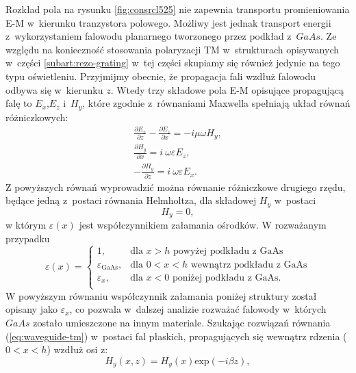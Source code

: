 Rozkład pola na rysunku \ref{fig:consrcl525} nie zapewnia transportu promieniowania E-M w~kierunku tranzystora polowego. Możliwy jest jednak transport energii z~wykorzystaniem falowodu planarnego tworzonego przez podkład z~$GaAs$. Ze względu na konieczność stosowania polaryzacji TM w~strukturach opisywanych w~części \ref{subart:rezo-grating} w~tej części skupiamy się również jedynie na tego typu oświetleniu. Przyjmijmy obecnie, że propagacja fali wzdłuż falowodu odbywa się w~kierunku $z$. Wtedy trzy składowe pola E-M opisujące propagującą falę to $E_x$,$E_z$ i~$H_y$, które zgodnie z~równaniami Maxwella spełniają układ równań różniczkowych:
\begin{equation}
\begin{gathered}
	\frac{\partial E_x}{\partial z} - \frac{\partial E_z}{\partial x} = -i \mu \omega H_y,\\	
	\frac{\partial H_y}{\partial x} = i~\omega \varepsilon E_z, \\
	- \frac{\partial H_y}{\partial z} = i~\omega \varepsilon E_x.
\end{gathered}
\end{equation}
Z powyższych równań wyprowadzić można równanie różniczkowe drugiego rzędu, będące jedną z~postaci równania Helmholtza, dla składowej $H_y$ w~postaci
\begin{equation}
	[ \frac{\partial^2}{\partial x^2} + \frac{\partial^2}{\partial z^2} + \omega^2 \mu_0 \varepsilon (x) ] H_y = 0,
	\label{eq:waveguide-tm}
\end{equation}
w którym $\varepsilon(x)$ jest współczynnikiem załamania ośrodków. W rozważanym przypadku
\begin{equation}
\varepsilon(x)=  
\begin{cases} 
	1, & \mbox{dla } x>h\mbox{ powyżej podkładu z~GaAs } \\ 
	\varepsilon_{\textrm{GaAs}}, & \mbox{dla } 0<x<h\mbox{ wewnątrz podkładu z~GaAs} \\
	\varepsilon_x,	&	\mbox{dla } x<0\mbox{ poniżej podkładu z~GaAs}.\\
\end{cases}
\end{equation}
W powyższym równaniu współczynnik załamania poniżej struktury został opisany jako $\varepsilon_x$, co pozwala w~dalszej analizie rozważać falowody w~których $GaAs$ zostało umieszczone na innym materiale. Szukając rozwiązań równania (\ref{eq:waveguide-tm}) w~postaci fal płaskich, propagujących się wewnątrz rdzenia ($0<x<h$) wzdłuż osi z:
\begin{equation}
	H_y(x,z)=H_y(x) \textrm{exp}(-i \beta z),
\end{equation}

